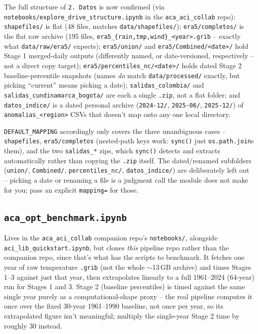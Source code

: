 \documentclass[11pt]{article}
\begin{document}
The full structure of \texttt{2. Datos} is now confirmed (via
\texttt{notebooks/explore\_drive\_structure.ipynb} in the
\texttt{aca\_aci\_collab} repo):
\texttt{shapefiles/} is flat (48 files, matches \texttt{data/shapefiles/});
\texttt{era5/completos/} is the flat raw archive (195 files,
\texttt{era5\_\{rain,tmp,wind\}\_<year>.grib} -- exactly what
\texttt{data/raw/era5/} expects); \texttt{era5/union/} and
\texttt{era5/Combined/<date>/} hold Stage 1 merged-daily outputs
(differently named, or date-versioned, respectively -- not a direct copy
target); \texttt{era5/percentiles\_nc/<date>/} holds dated Stage 2
baseline-percentile snapshots (names \emph{do} match
\texttt{data/processed/} exactly, but picking ``current'' means picking a
date); \texttt{salidas\_colombia/} and
\texttt{salidas\_cundinamarca\_bogota/} are each a single \texttt{.zip},
not a flat folder; and \texttt{datos\_indice/} is a dated personal archive
(\texttt{2024-12/}, \texttt{2025-06/}, \texttt{2025-12/}) of
\texttt{anomalias\_<region>} CSVs that doesn't map onto any one local
directory.

\texttt{DEFAULT\_MAPPING} accordingly only covers the three
unambiguous cases -- \texttt{shapefiles}, \texttt{era5/completos}
(nested-path keys work: \texttt{sync()} just \texttt{os.path.join}s them),
and the two \texttt{salidas\_*} zips, which \texttt{sync()} detects and
extracts automatically rather than copying the \texttt{.zip} itself. The
dated/renamed subfolders (\texttt{union/}, \texttt{Combined/},
\texttt{percentiles\_nc/}, \texttt{datos\_indice/}) are deliberately left
out -- picking a date or renaming a file is a judgment call the module
does not make for you; pass an explicit \texttt{mapping=} for those.

\subsection{\texttt{aca\_opt\_benchmark.ipynb}}

Lives in the \texttt{aca\_aci\_collab} companion repo's
\texttt{notebooks/}, alongside \texttt{aci\_lib\_quickstart.ipynb}, but
clones \emph{this} pipeline repo rather than the companion repo, since
that's what has the scripts to benchmark. It fetches one year of raw
temperature \texttt{.grib} (not the whole $\sim$13\,GB archive) and times
Stages 1--3 against just that year, then extrapolates linearly to a full
1961--2024 (64-year) run for Stages 1 and 3. Stage 2 (baseline percentiles)
is timed against the same single year purely as a computational-shape
proxy -- the real pipeline computes it once over the fixed 30-year
1961--1990 baseline, not once per year, so its extrapolated figure isn't
meaningful; multiply the single-year Stage 2 time by roughly 30 instead.
\end{document}
